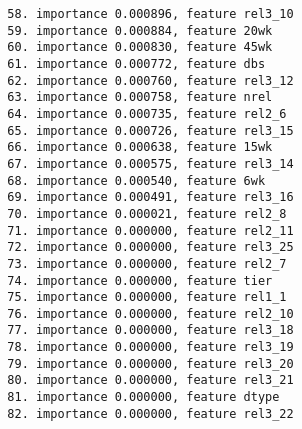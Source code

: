 \begin{verbatim}
  58. importance 0.000896, feature rel3_10
  59. importance 0.000884, feature 20wk
  60. importance 0.000830, feature 45wk
  61. importance 0.000772, feature dbs
  62. importance 0.000760, feature rel3_12
  63. importance 0.000758, feature nrel
  64. importance 0.000735, feature rel2_6
  65. importance 0.000726, feature rel3_15
  66. importance 0.000638, feature 15wk
  67. importance 0.000575, feature rel3_14
  68. importance 0.000540, feature 6wk
  69. importance 0.000491, feature rel3_16
  70. importance 0.000021, feature rel2_8
  71. importance 0.000000, feature rel2_11
  72. importance 0.000000, feature rel3_25
  73. importance 0.000000, feature rel2_7
  74. importance 0.000000, feature tier
  75. importance 0.000000, feature rel1_1
  76. importance 0.000000, feature rel2_10
  77. importance 0.000000, feature rel3_18
  78. importance 0.000000, feature rel3_19
  79. importance 0.000000, feature rel3_20
  80. importance 0.000000, feature rel3_21
  81. importance 0.000000, feature dtype
  82. importance 0.000000, feature rel3_22
\end{verbatim}
